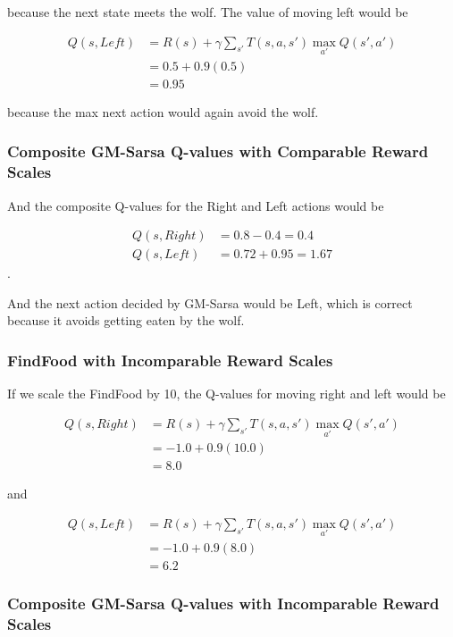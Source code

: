 because the next state meets the wolf. The value of moving left would be

\begin{align*}
Q(s, Left) &= R(s) + \gamma \sum_{s'} T(s, a, s') \max_{a'} Q(s', a')\\
             &= 0.5 + 0.9 (0.5)\\
             &= 0.95
\end{align*}

because the max next action would again avoid the wolf.

\subsubsection{Composite GM-Sarsa Q-values with Comparable Reward Scales}

And the composite Q-values for the Right and Left actions would be

\begin{align*}
  Q(s, Right) &= 0.8 - 0.4 = 0.4\\
  Q(s, Left) &= 0.72 + 0.95 = 1.67
\end{align*}.

And the next action decided by GM-Sarsa would be Left, which is correct because it avoids getting eaten by the wolf.

\subsubsection{FindFood with Incomparable Reward Scales}

If we scale the FindFood by 10, the Q-values for moving right and left would be

\begin{align*}
Q(s, Right) &= R(s) + \gamma \sum_{s'} T(s, a, s') \max_{a'} Q(s', a')\\
              &= -1.0 + 0.9 (10.0)\\
              &= 8.0
\end{align*}

and

\begin{align*}
Q(s, Left) &= R(s) + \gamma \sum_{s'} T(s, a, s') \max_{a'} Q(s', a')\\
             &= -1.0 + 0.9 (8.0)\\
             &= 6.2
\end{align*}

\subsubsection{Composite GM-Sarsa Q-values with Incomparable Reward Scales}

